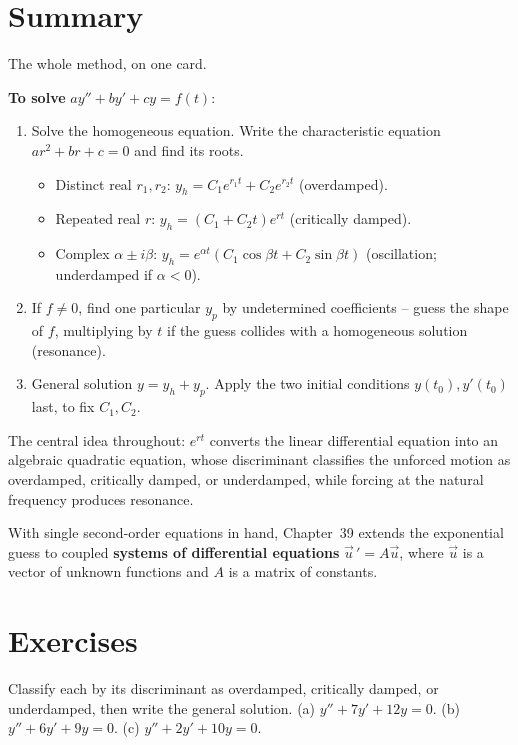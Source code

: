\section{Summary}
\label{ch38:summary}

\begin{focusbox}
The whole method, on one card.

\textbf{To solve} $a y'' + b y' + c y = f(t)$:
\begin{enumerate}
  \item Solve the homogeneous equation. Write the characteristic equation $a r^2
  + b r + c = 0$ and find its roots.
  \begin{itemize}
    \item Distinct real $r_1, r_2$: \quad $y_h = C_1 e^{r_1 t} + C_2 e^{r_2 t}$
    (overdamped).
    \item Repeated real $r$: \quad $y_h = (C_1 + C_2 t)e^{rt}$ (critically damped).
    \item Complex $\alpha \pm i\beta$: \quad $y_h = e^{\alpha t}(C_1\cos\beta t +
    C_2\sin\beta t)$ (oscillation; underdamped if $\alpha < 0$).
  \end{itemize}
  \item If $f \neq 0$, find one particular $y_p$ by undetermined coefficients --
  guess the shape of $f$, multiplying by $t$ if the guess collides with a
  homogeneous solution (resonance).
  \item General solution $y = y_h + y_p$. Apply the two initial conditions
  $y(t_0), y'(t_0)$ last, to fix $C_1, C_2$.
\end{enumerate}
The central idea throughout: $e^{rt}$ converts the linear differential equation into an
algebraic quadratic equation, whose discriminant classifies the unforced motion as
overdamped, critically damped, or underdamped, while forcing at the natural frequency produces resonance.
\end{focusbox}

With single second-order equations in hand, Chapter~39 extends the exponential
guess to coupled \textbf{systems of differential equations} $\vec u\,' = A\vec u$,
where $\vec u$ is a vector of unknown functions and $A$ is a matrix of
constants.

\section{Exercises}
\label{ch38:exercises}

\begin{exercise}
\label{ch38:ex-1}
Classify each by its discriminant as overdamped, critically damped, or
underdamped, then write the general solution.
(a) $y'' + 7y' + 12y = 0$. \quad
(b) $y'' + 6y' + 9y = 0$. \quad
(c) $y'' + 2y' + 10y = 0$.
\end{exercise}


